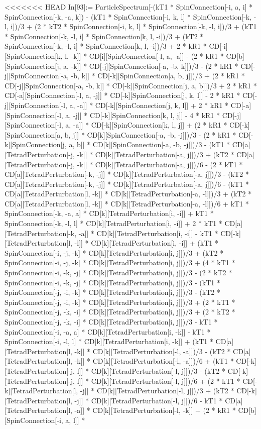 <<<<<<< HEAD
In[93]:= ParticleSpectrum[-(kT1 * SpinConnection[-i, a, i] * SpinConnection[-k, -a, k]) - (kT1 * SpinConnection[-i, k, l] * SpinConnection[-k, -l, i])/3 + (2 * kT2 * SpinConnection[-i, k, l] * SpinConnection[-k, -l, i])/3 + (kT1 * SpinConnection[-k, -l, i] * SpinConnection[k, l, -i])/3 + (kT2 * SpinConnection[-k, -l, i] * SpinConnection[k, l, -i])/3 + 2 * kR1 * CD[-i][SpinConnection[k, l, -k]] * CD[i][SpinConnection[-l, a, -a]] - (2 * kR1 * CD[b][SpinConnection[j, a, -k]] * CD[-j][SpinConnection[-a, -b, k]])/3 - (2 * kR1 * CD[-j][SpinConnection[-a, -b, k]] * CD[-k][SpinConnection[a, b, j]])/3 + (2 * kR1 * CD[-j][SpinConnection[-a, -b, k]] * CD[-k][SpinConnection[j, a, b]])/3 + 2 * kR1 * CD[-a][SpinConnection[-l, a, -j]] * CD[-k][SpinConnection[j, k, l]] - 2 * kR1 * CD[-j][SpinConnection[-l, a, -a]] * CD[-k][SpinConnection[j, k, l]] + 2 * kR1 * CD[-a][SpinConnection[-l, a, -j]] * CD[-k][SpinConnection[k, l, j]] - 4 * kR1 * CD[-j][SpinConnection[-l, a, -a]] * CD[-k][SpinConnection[k, l, j]] + (2 * kR1 * CD[-k][SpinConnection[a, b, j]] * CD[k][SpinConnection[-a, -b, -j]])/3 - (2 * kR1 * CD[-k][SpinConnection[j, a, b]] * CD[k][SpinConnection[-a, -b, -j]])/3 - (kT1 * CD[a][TetradPerturbation[-j, -k]] * CD[k][TetradPerturbation[-a, j]])/3 + (kT2 * CD[a][TetradPerturbation[-j, -k]] * CD[k][TetradPerturbation[-a, j]])/6 - (2 * kT1 * CD[a][TetradPerturbation[-k, -j]] * CD[k][TetradPerturbation[-a, j]])/3 - (kT2 * CD[a][TetradPerturbation[-k, -j]] * CD[k][TetradPerturbation[-a, j]])/6 - (kT1 * CD[a][TetradPerturbation[l, -k]] * CD[k][TetradPerturbation[-a, -l]])/3 + (kT2 * CD[a][TetradPerturbation[l, -k]] * CD[k][TetradPerturbation[-a, -l]])/6 + kT1 * SpinConnection[-k, -a, a] * CD[k][TetradPerturbation[i, -i]] + kT1 * SpinConnection[-k, -l, l] * CD[k][TetradPerturbation[i, -i]] + 2 * kT1 * CD[a][TetradPerturbation[-k, -a]] * CD[k][TetradPerturbation[i, -i]] - kT1 * CD[-k][TetradPerturbation[l, -l]] * CD[k][TetradPerturbation[i, -i]] + (kT1 * SpinConnection[-i, -j, -k] * CD[k][TetradPerturbation[i, j]])/3 + (kT2 * SpinConnection[-i, -j, -k] * CD[k][TetradPerturbation[i, j]])/3 + (4 * kT1 * SpinConnection[-i, -k, -j] * CD[k][TetradPerturbation[i, j]])/3 - (2 * kT2 * SpinConnection[-i, -k, -j] * CD[k][TetradPerturbation[i, j]])/3 - (kT1 * SpinConnection[-j, -i, -k] * CD[k][TetradPerturbation[i, j]])/3 - (kT2 * SpinConnection[-j, -i, -k] * CD[k][TetradPerturbation[i, j]])/3 + (2 * kT1 * SpinConnection[-j, -k, -i] * CD[k][TetradPerturbation[i, j]])/3 + (2 * kT2 * SpinConnection[-j, -k, -i] * CD[k][TetradPerturbation[i, j]])/3 - kT1 * SpinConnection[-i, -a, a] * CD[k][TetradPerturbation[i, -k]] - kT1 * SpinConnection[-i, -l, l] * CD[k][TetradPerturbation[i, -k]] + (kT1 * CD[a][TetradPerturbation[l, -k]] * CD[k][TetradPerturbation[-l, -a]])/3 - (kT2 * CD[a][TetradPerturbation[l, -k]] * CD[k][TetradPerturbation[-l, -a]])/6 + (kT1 * CD[-k][TetradPerturbation[-j, l]] * CD[k][TetradPerturbation[-l, j]])/3 - (kT2 * CD[-k][TetradPerturbation[-j, l]] * CD[k][TetradPerturbation[-l, j]])/6 + (2 * kT1 * CD[-k][TetradPerturbation[l, -j]] * CD[k][TetradPerturbation[-l, j]])/3 + (kT2 * CD[-k][TetradPerturbation[l, -j]] * CD[k][TetradPerturbation[-l, j]])/6 - kT1 * CD[a][TetradPerturbation[l, -a]] * CD[k][TetradPerturbation[-l, -k]] + (2 * kR1 * CD[b][SpinConnection[-i, a, l]] * 